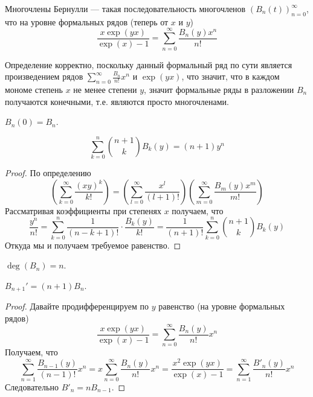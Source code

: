 \documentclass[12pt,a4paper]{article}
\begin{document}
    \begin{definition}
        Многочлены Бернулли --- такая последовательность многочленов $(B_n(t))_{n=0}^\infty$, что на уровне формальных рядов (теперь от $x$ и $y$)
        \[\frac{x \exp(yx)}{\exp(x) - 1} = \sum_{n=0}^\infty \frac{B_n(y) x^n}{n!}\]
    \end{definition}

    \begin{remark*}
        Определение корректно, поскольку данный формальный ряд по сути является произведением рядов $\sum_{n=0}^\infty \frac{B_n}{n!} x^n$ и $\exp(yx)$, что значит, что в каждом мономе степень $x$ не менее степени $y$, значит формальные ряды в разложении $B_n$ получаются конечными, т.е. являются просто многочленами.
    \end{remark*}

    \begin{corollary}
        $B_n(0) = B_n$.
    \end{corollary}

    \begin{lemma}
        \[\sum_{k=0}^n \binom{n+1}{k} B_k(y) = (n+1) y^n\]
    \end{lemma}

    \begin{proof}
        По определению
        \[\left(\sum_{k=0}^\infty \frac{(xy)^k}{k!}\right) = \left(\sum_{l=0}^\infty \frac{x^l}{(l+1)!}\right) \left(\sum_{m=0}^\infty \frac{B_m(y) x^m}{m!}\right)\]
        Рассматривая коэффициенты при степенях $x$ получаем, что
        \[\frac{y^n}{n!} = \sum_{k=0}^n \frac{1}{(n-k+1)!} \cdot \frac{B_k(y)}{k!} = \frac{1}{(n+1)!} \sum_{k=0}^n \binom{n+1}{k} B_k(y)\]
        Откуда мы и получаем требуемое равенство.
    \end{proof}

    \begin{corollary}
        $\deg(B_n) = n$.
    \end{corollary}

    \begin{lemma}
        $B_{n+1}' = (n+1) B_{n}$.
    \end{lemma}

    \begin{proof}
        Давайте продифференцируем по $y$ равенство (на уровне формальных рядов)
        \[\frac{x \exp(yx)}{\exp(x) - 1} = \sum_{n=0}^\infty \frac{B_n(y)}{n!} x^n\]
        Получаем, что
        \[\sum_{n=1}^\infty \frac{B_{n-1}(y)}{(n-1)!} x^n = x \sum_{n=0}^\infty \frac{B_n(y)}{n!} x^n = \frac{x^2 \exp(yx)}{\exp(x) - 1} = \sum_{n=1}^\infty \frac{B'_n(y)}{n!} x^n\]
        Следовательно $B'_n = n B_{n-1}$.
    \end{proof}
\end{document}
